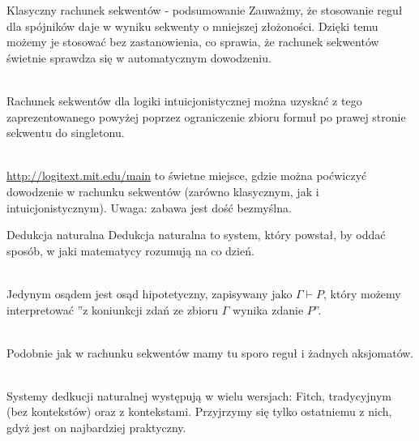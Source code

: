 \documentclass{beamer}
\begin{document}
\begin{frame}{Klasyczny rachunek sekwentów - podsumowanie}
	Zauważmy, że stosowanie reguł dla spójników daje w wyniku sekwenty o mniejszej złożoności. Dzięki temu możemy je stosować bez zastanowienia, co sprawia, że rachunek sekwentów świetnie sprawdza się w automatycznym dowodzeniu. \\~\
	
	Rachunek sekwentów dla logiki intuicjonistycznej można uzyskać z tego zaprezentowanego powyżej poprzez ograniczenie zbioru formuł po prawej stronie sekwentu do singletonu. \\~\
	
	\url{http://logitext.mit.edu/main}
	 to świetne miejsce, gdzie można poćwiczyć dowodzenie w rachunku sekwentów (zarówno klasycznym, jak i intuicjonistycznym). Uwaga: zabawa jest dość bezmyślna.
\end{frame}

\begin{frame}{Dedukcja naturalna}
	Dedukcja naturalna to system, który powstał, by oddać sposób, w jaki matematycy rozumują na co dzień. \\~\
	
	Jedynym osądem jest osąd hipotetyczny, zapisywany jako $\Gamma \vdash P$, który możemy interpretować ''z koniunkcji zdań ze zbioru $\Gamma$ wynika zdanie $P$''. \\~\
	
	Podobnie jak w rachunku sekwentów mamy tu sporo reguł i żadnych aksjomatów. \\~\
	
	Systemy dedkucji naturalnej występują w wielu wersjach: Fitch, tradycyjnym (bez kontekstów) oraz z kontekstami. Przyjrzymy się tylko ostatniemu z nich, gdyż jest on najbardziej praktyczny.
\end{frame}
\end{document}
